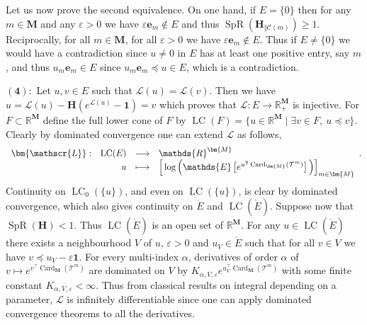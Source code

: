 \documentclass[reqno,final,11pt]{amsart}
\theoremstyle{plain}
\theoremstyle{definition}
\theoremstyle{remark}
\newcommand{\R}{\mathds{R}}
\newcommand{\E}[1]{\mathds{E}\left[#1\right]}
\newcommand{\M}{\bm{M}}
\newcommand{\T}{\mathcal{T}}
\newcommand{\C}{\mathcal{C}}
\renewcommand{\L}{\bm{\mathscr{L}}}
\newcommand{\ones}{\bm{1}}
\newcommand{\e}{\bm{e}}
\renewcommand{\H}{\bm{H}}
\newcommand{\pos}{\R_+^{\M}}
\newcommand{\CE}{\ce_{0}}
\newcommand{\CEt}{\ce}
\newcommand{\trp}{^{\intercal}}
\newcommand{\fonction}[5]{\begin{array}[t]{lrcl}
#1: & #2 & \longrightarrow & #3 \\
    & #4 & \longmapsto & #5 \end{array}}
\DeclareMathOperator{\card}{Card}
\DeclareMathOperator{\spr}{SpR}
\DeclareMathOperator{\ce}{LC}
\begin{document}
	Let us now prove the second equivalence. On one hand, if $E = \{0\}$ then for any $m\in\M$ and any $\varepsilon >0$ we have $\varepsilon \e_m \notin E$ and thus $\spr(\H_{\Vert \C(m)})\geq 1$. Reciprocally, for all $m\in\M$, for all $\varepsilon>0$ we have $\varepsilon \e_m \notin E$. Thus if $E \neq \{0\}$ we would have a contradiction since $u\neq 0$ in $E$ has at least one positive entry, say $m$, and thus $u_m \e_m \in E$ since $u_m \e_m \preceq u\in E$, which is a contradiction.
	
$\bm{(4):}$ Let $u,v\in E$ such that $\L(u) = \L(v)$. Then we have $u = \L(u)-\H(e^{\L(u)}-\ones) = v$ which proves that $\L:E\longrightarrow \pos$ is injective. For $F\subset \R^{\M}$ define the full lower cone of $F$ by $\CEt(F) = \{ u\in\R^{\M} \mid \exists v\in F, \ u\preceq v\}$. Clearly by dominated convergence one can extend $\L$ as follows,
\[\fonction{\L}{\CEt(E)}{\R^{\M}}{u}{\Big[\log\Big(\E{e^{u\trp \card_{\M}(\T^m)}}\Big)\Big]_{m\in\M}}.\] Continuity on $\CE(\{u\})$, and even on $\CEt(\{u\})$, is clear by dominated convergence, which also gives continuity on $\mathring{E}$ and $\CEt(\mathring{E})$. Suppose now that $\spr(\H)<1$. Thus $\CEt(\mathring{E})$ is an open set of $\R^{\M}$. For any $u\in \CEt(\mathring{E})$ there exists a neighbourhood $V$ of $u$, $\varepsilon >0$ and $u_V \in \mathring{E}$ such that for all $v\in V$ we have $v \preceq u_V-\varepsilon\ones$. For every multi-index $\alpha$, derivatives of order $\alpha$ of $v\mapsto e^{v\trp \card_{\M}(\T^m)}$ are dominated on $V$ by $K_{\alpha,V,\varepsilon} e^{u_V\trp \card_{\M}(\T^m)}$ with some finite constant $K_{\alpha,V,\varepsilon}<\infty$. Thus from classical results on integral depending on a parameter, $\L$ is infinitely differentiable since one can apply dominated convergence theorems to all the derivatives.
	
\end{document}
